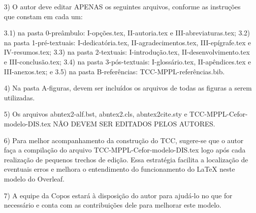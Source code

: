 3) O autor deve editar APENAS os seguintes arquivos, conforme as instruções que constam em cada um:

3.1) na pasta 0-preâmbulo: I-opções.tex, II-autoria.tex e III-abreviaturas.tex;
3.2) na pasta 1-pré-textuais: I-dedicatória.tex, II-agradecimentos.tex, III-epígrafe.tex e IV-resumos.tex;
3.3) na pasta 2-textuais: I-introdução.tex, II-desenvolvimento.tex e III-conclusão.tex;
3.4) na pasta 3-pós-textuais: I-glossário.tex, II-apêndices.tex e III-anexos.tex; e
3.5) na pasta B-referências: TCC-MPPL-referências.bib.

4) Na pasta A-figuras, devem ser incluídos os arquivos de todas as figuras a serem utilizadas.

5) Os arquivos abntex2-alf.bst, abntex2.cls, abntex2cite.sty e TCC-MPPL-Cefor-modelo-DIS.tex NÃO DEVEM SER EDITADOS PELOS AUTORES.

6) Para melhor acompanhamento da construção do TCC, sugere-se que o autor faça a compilação do arquivo TCC-MPPL-Cefor-modelo-DIS.tex logo após cada realização de pequenos trechos de edição. Essa estratégia facilita a localização de eventuais erros e melhora o entendimento do funcionamento do LaTeX neste modelo do Overleaf.

7) A equipe da Copos estará à disposição do autor para ajudá-lo no que for necessário e conta com as contribuições dele para melhorar este modelo.